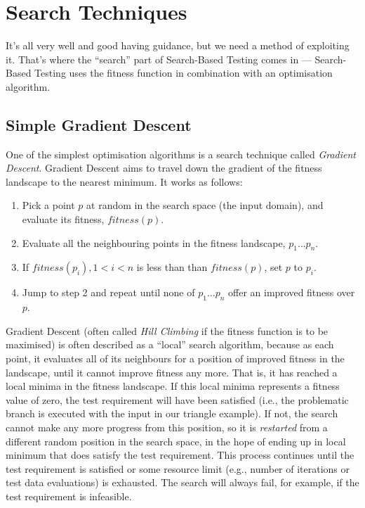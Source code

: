 \section{Search Techniques}

It's all very well and good having guidance, but we need a method of exploiting
it. That's where the ``search'' part of Search-Based Testing comes in ---
Search-Based Testing uses the fitness function in combination with an
optimisation algorithm. 

\subsection{Simple Gradient Descent}

One of the simplest optimisation algorithms is a search technique called {\it
Gradient Descent}. Gradient Descent aims to travel down the gradient of the
fitness landscape to the nearest minimum. It works as follows:

\begin{enumerate}
    \item Pick a point $p$ at random in the search space (the input domain), and
    evaluate its fitness, $\mathit{fitness}(p)$.

    \item Evaluate all the neighbouring points in the fitness landscape, $p_1
    \dots p_n$.

    \item If $\mathit{fitness}(p_i), 1 < i < n$ is less than than
    $\mathit{fitness}(p)$, set $p$ to $p_i$.

    \item Jump to step 2 and repeat until none of $p_1 \dots p_n$ offer an
    improved fitness over $p$.
\end{enumerate}

Gradient Descent (often called {\it Hill Climbing} if the fitness function is to
be maximised) is often described as a ``local'' search algorithm, because as
each point, it evaluates all of its neighbours for a position of improved
fitness in the landscape, until it cannot improve fitness any more. That is, it
has reached a local minima in the fitness landscape. If this local minima
represents a fitness value of zero, the test requirement will have been
satisfied (i.e., the problematic branch is executed with the input in our
triangle example). If not, the search cannot make any more progress from this
position, so it is {\it restarted} from a different random position in the
search space, in the hope of ending up in local minimum that does satisfy the
test requirement. This process continues until the test requirement is satisfied
or some resource limit (e.g., number of iterations or test data evaluations) is
exhausted. The search will always fail, for example, if the test requirement is
infeasible. 

